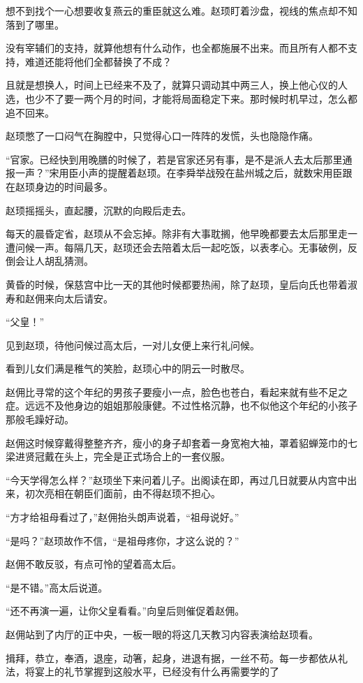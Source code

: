 想不到找个一心想要收复燕云的重臣就这么难。赵顼盯着沙盘，视线的焦点却不知落到了哪里。

没有宰辅们的支持，就算他想有什么动作，也全都施展不出来。而且所有人都不支持，难道还能将他们全都替换了不成？

且就是想换人，时间上已经来不及了，就算只调动其中两三人，换上他心仪的人选，也少不了要一两个月的时间，才能将局面稳定下来。那时候时机早过，怎么都追不回来。

赵顼憋了一口闷气在胸膛中，只觉得心口一阵阵的发慌，头也隐隐作痛。

“官家。已经快到用晚膳的时候了，若是官家还另有事，是不是派人去太后那里通报一声？”宋用臣小声的提醒着赵顼。在李舜举战殁在盐州城之后，就数宋用臣跟在赵顼身边的时间最多。

赵顼摇摇头，直起腰，沉默的向殿后走去。

每天的晨昏定省，赵顼从不会忘掉。除非有大事耽搁，他早晚都要去太后那里走一遭问候一声。每隔几天，赵顼还会去陪着太后一起吃饭，以表孝心。无事破例，反倒会让人胡乱猜测。

黄昏的时候，保慈宫中比一天的其他时候都要热闹，除了赵顼，皇后向氏也带着淑寿和赵佣来向太后请安。

“父皇！”

见到赵顼，待他问候过高太后，一对儿女便上来行礼问候。

看到儿女们满是稚气的笑脸，赵顼心中的阴云一时散尽。

赵佣比寻常的这个年纪的男孩子要瘦小一点，脸色也苍白，看起来就有些不足之症。远远不及他身边的姐姐那般康健。不过性格沉静，也不似他这个年纪的小孩子那般毛躁好动。

赵佣这时候穿戴得整整齐齐，瘦小的身子却套着一身宽袍大袖，罩着貂蝉笼巾的七梁进贤冠戴在头上，完全是正式场合上的一套仪服。

“今天学得怎么样？”赵顼坐下来问着儿子。出阁读在即，再过几日就要从内宫中出来，初次亮相在朝臣们面前，由不得赵顼不担心。

“方才给祖母看过了，”赵佣抬头朗声说着，“祖母说好。”

“是吗？”赵顼故作不信，“是祖母疼你，才这么说的？”

赵佣不敢反驳，有点可怜的望着高太后。

“是不错。”高太后说道。

“还不再演一遍，让你父皇看看。”向皇后则催促着赵佣。

赵佣站到了内厅的正中央，一板一眼的将这几天教习内容表演给赵顼看。

揖拜，恭立，奉酒，退座，动箸，起身，进退有据，一丝不苟。每一步都依从礼法，将宴上的礼节掌握到这般水平，已经没有什么再需要学的了

